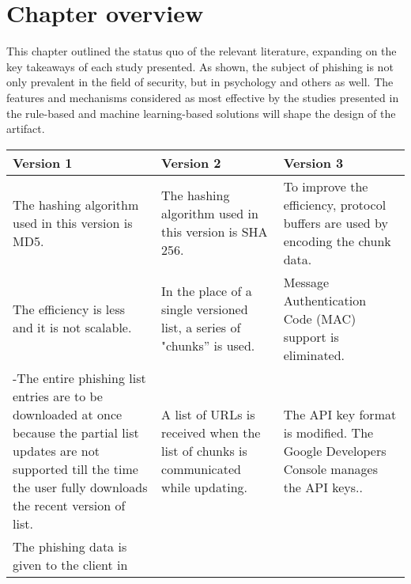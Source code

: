 \section{Chapter overview}
This chapter outlined the status quo of the relevant literature, expanding on
the key takeaways of each study presented. As shown, the subject of phishing is
not only prevalent in the field of security, but in psychology and others as
well. The features and mechanisms considered as most effective by the studies
presented in the rule-based and machine learning-based solutions will shape the
design of the artifact.

\begin{singlespace}
	\begin{table}[!h]
		\begin{center}
			\small
			\label{tab:GSB_VERSIONS}
			\begin{tabular}{ | m{13em} | m{12.9em} | m{13em} | }
				\hline
				\textbf{Version 1}                     &
				\textbf{Version 2}                     &
				\textbf{Version 3}                                                                                                                     \\
				\hline
				The hashing algorithm used in this
				version is MD5.                        & The hashing algorithm used in this
				version is SHA 256.                    & To improve the efficiency, protocol buffers are
				used by encoding the chunk data.                                                                                                       \\
				\hline
				The efficiency is less and it is not
				scalable.                              & In the place of a single versioned
				list, a series of "chunks” is used.    & Message Authentication Code (MAC) support
				is eliminated.                                                                        \\
				\hline
				-The entire phishing list entries are to be
				downloaded at once because the
				partial list updates are not supported
				till the time the user fully downloads
				the recent version of list.            & A list of URLs is received when the
				list of chunks is communicated
				while updating.                        & The API key format is modified. The Google
				Developers Console manages the API keys..                                                                                                      \\
				\hline
				The phishing data is given to the client in

\end{tabular}
\end{center}
\end{table}
\end{singlespace}
